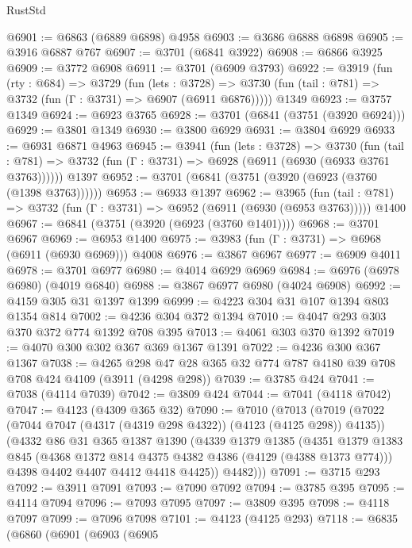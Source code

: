 \begin{lexlean}{RustStd}
\begin{coremodule}
{\begin{coremodule}
{{{{{{{{{{{{{{@6901 := @6863 (@6889 @6898) @4958
@6903 := @3686 @6888 @6898
@6905 := @3916 @6887 @767
@6907 := @3701 (@6841 @3922)
@6908 := @6866 @3925
@6909 := @3772 @6908
@6911 := @3701 (@6909 @3793)
@6922 := @3919
    (fun (rty : @684) =>
    @3729
      (fun (lets : @3728) =>
      @3730 (fun (tail : @781) => @3732 (fun (Γ : @3731) => @6907 (@6911 @6876)))))
    @1349
@6923 := @3757 @1349
@6924 := @6923 @3765
@6928 := @3701 (@6841 (@3751 (@3920 @6924)))
@6929 := @3801 @1349
@6930 := @3800 @6929
@6931 := @3804 @6929
@6933 := @6931 @6871 @4963
@6945 := @3941
    (fun (lets : @3728) =>
    @3730
      (fun (tail : @781) => @3732 (fun (Γ : @3731) => @6928 (@6911 (@6930 (@6933 @3761 @3763))))))
    @1397
@6952 := @3701 (@6841 (@3751 (@3920 (@6923 (@3760 (@1398 @3763))))))
@6953 := @6933 @1397
@6962 := @3965
    (fun (tail : @781) => @3732 (fun (Γ : @3731) => @6952 (@6911 (@6930 (@6953 @3763)))))
    @1400
@6967 := @6841 (@3751 (@3920 (@6923 (@3760 @1401))))
@6968 := @3701 @6967
@6969 := @6953 @1400
@6975 := @3983 (fun (Γ : @3731) => @6968 (@6911 (@6930 @6969))) @4008
@6976 := @3867 @6967
@6977 := @6909 @4011
@6978 := @3701 @6977
@6980 := @4014 @6929 @6969
@6984 := @6976 (@6978 @6980) (@4019 @6840)
@6988 := @3867 @6977 @6980 (@4024 @6908)
@6992 := @4159 @305 @31 @1397 @1399
@6999 := @4223 @304 @31 @107 @1394 @803 @1354 @814
@7002 := @4236 @304 @372 @1394
@7010 := @4047 @293 @303 @370 @372 @774 @1392 @708 @395
@7013 := @4061 @303 @370 @1392
@7019 := @4070 @300 @302 @367 @369 @1367 @1391
@7022 := @4236 @300 @367 @1367
@7038 := @4265 @298 @47 @28 @365 @32 @774 @787 @4180 @39 @708 @708 @424 @4109 (@3911 (@4298 @298))
@7039 := @3785 @424
@7041 := @7038 (@4114 @7039)
@7042 := @3809 @424
@7044 := @7041 (@4118 @7042)
@7047 := @4123 (@4309 @365 @32)
@7090 := @7010
    (@7013
      (@7019
        (@7022 (@7044 @7047 (@4317 (@4319 @298 @4322)) (@4123 (@4125 @298)) @4135))
        (@4332
          @86
          @31
          @365
          @1387
          @1390
          (@4339
            @1379
            @1385
            (@4351
              @1379
              @1383
              @845
              (@4368 @1372 @814 @4375 @4382 @4386 (@4129 (@4388 @1373 @774)))
              @4398
              @4402
              @4407
              @4412
              @4418
              @4425))
          @4482)))
@7091 := @3715 @293
@7092 := @3911 @7091
@7093 := @7090 @7092
@7094 := @3785 @395
@7095 := @4114 @7094
@7096 := @7093 @7095
@7097 := @3809 @395
@7098 := @4118 @7097
@7099 := @7096 @7098
@7101 := @4123 (@4125 @293)
@7118 := @6835
    (@6860
      (@6901
        (@6903
          (@6905
}}}}}}}}}}}}}}
\end{coremodule}}
\end{coremodule}
\end{lexlean}
